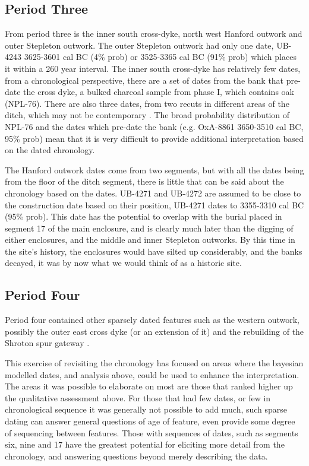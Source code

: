 \subsection{Period Three}
From period three is the inner south cross-dyke, north west Hanford outwork and outer Stepleton outwork. The outer Stepleton outwork had only one date, UB-4243 3625-3601 cal BC (4\% prob) or 3525-3365 cal BC (91\% prob) which places it within a 260 year interval. The inner south cross-dyke has relatively few dates, from a chronological perspective, there are a set of dates from the bank that pre-date the cross dyke, a bulked charcoal sample from phase I, which contains oak (NPL-76). There are also three dates, from two recuts in different areas of the ditch, which may not be contemporary \citep[402]{Mercer:2008fk}. The broad probability distribution of NPL-76 and the dates which pre-date the bank (e.g. OxA-8861 3650-3510 cal BC, 95\% prob) mean that it is very difficult to provide additional interpretation based on the dated chronology. 

The Hanford outwork dates come from two segments, but with all the dates being from the floor of the ditch segment, there is little that can be said about the chronology based on the dates. UB-4271 and UB-4272 are assumed to be close to the construction date \citep[397]{Mercer:2008fk} based on their position, UB-4271 dates to 3355-3310 cal BC (95\% prob). This date has the potential to overlap with the burial placed in segment 17 of the main enclosure, and is clearly much later than the digging of either enclosures, and the middle and inner Stepleton outworks. By this time in the site's history, the enclosures would have silted up considerably, and the banks decayed, it was by now what we would think of as a historic site.

\subsection{Period Four}
Period four contained other sparsely dated features such as the western outwork, possibly the outer east cross dyke (or an extension of it) and the rebuilding of the Shroton spur gateway \citep[144]{Whittle:2011kl}.
  
This exercise of revisiting the chronology has focused on areas where the bayesian modelled dates, and analysis above, could be used to enhance the interpretation. The areas it was possible to elaborate on most are those that ranked higher up the qualitative assessment above. For those that had few dates, or few in chronological sequence it was generally not possible to add much, such sparse dating can answer general questions of age of feature, even provide some degree of sequencing between features. Those with sequences of dates, such as segments six, nine and 17 have the greatest potential for eliciting more detail from the chronology, and answering questions beyond merely describing the data.

